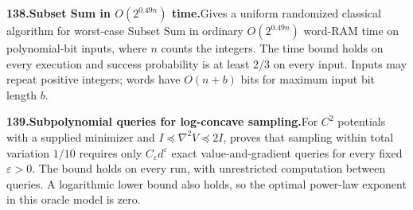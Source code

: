 \documentclass[11pt,a4paper]{article}
\begin{document}
  \par \begin{minipage}{\linewidth}
  \fontsize{10.5}{12.6}\selectfont\RaggedRight
  \hypertarget{result 138}{}
  {\bfseries\textcolor{muted}{138.}\enspace Subset Sum in $O(2^{0.49n})$ time.}\enspace Gives a uniform randomized classical algorithm for worst-case Subset Sum in ordinary $O(2^{0.49n})$ word-RAM time on polynomial-bit inputs, where $n$ counts the integers. The time bound holds on every execution and success probability is at least $2/3$ on every input. Inputs may repeat positive integers; words have $O(n+b)$ bits for maximum input bit length $b$.\par
  \end{minipage}\par\vspace{5pt}



  \par \begin{minipage}{\linewidth}
  \fontsize{10.5}{12.6}\selectfont\RaggedRight
  \hypertarget{result 139}{}
  {\bfseries\textcolor{muted}{139.}\enspace Subpolynomial queries for log-concave sampling.}\enspace For $C^2$ potentials with a supplied minimizer and $I\preceq\nabla^2V\preceq2I$, proves that sampling within total variation $1/10$ requires only $C_\varepsilon d^\varepsilon$ exact value-and-gradient queries for every fixed $\varepsilon>0$. The bound holds on every run, with unrestricted computation between queries. A logarithmic lower bound also holds, so the optimal power-law exponent in this oracle model is zero.\par
  \end{minipage}\par\vspace{5pt}
\end{document}
